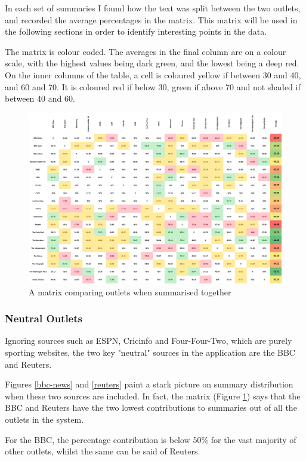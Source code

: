 \documentclass[12pt]{article}
\begin{document}
In each set of summaries I found how the text was split between the two outlets, and recorded the average percentages in the matrix. This matrix will be used in the following sections in order to identify interesting points in the data. 

The matrix is colour coded. The averages in the final column are on a colour scale, with the highest values being dark green, and the lowest being a deep red. On the inner columns of the table, a cell is coloured yellow if between 30 and 40, and 60 and 70. It is coloured red if below 30, green if above 70 and not shaded if between 40 and 60.

\begin{figure}
    \centering
    \includegraphics[width=\textwidth]{matrix.png}
    \caption{A matrix comparing outlets when summarised together}
    \label{fig:matrix}
\end{figure}

\subsubsection{Neutral Outlets}

Ignoring sources such as ESPN, Cricinfo and Four-Four-Two, which are purely sporting websites, the two key "neutral" sources in the application are the BBC and Reuters.

Figures \ref{bbc-news} and \ref{reuters} paint a stark picture on summary distribution when these two sources are included. In fact, the matrix (Figure \ref{fig:matrix}) says that the BBC and Reuters have the two lowest contributions to summaries out of all the outlets in the system. 

For the BBC, the percentage contribution is below 50\% for the vast majority of other outlets, whilst the same can be said of Reuters.
\end{document}
